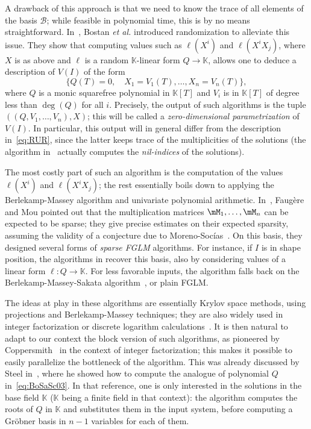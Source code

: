 \documentclass[12pt]{article}
\newcommand{\basis}{\mathscr{B}}
\newcommand{\lf}{X}
\def\K{\mathbb{K}}
\def\K {\ensuremath{\mathbb{K}}}
\begin{document}
A drawback of this approach is that we need to know the trace of all
elements of the basis $\basis$; while feasible in polynomial time,
this is by no means straightforward. In~\cite{BoSaSc03}, Bostan {\it
  et al.} introduced randomization to alleviate this issue. They show
that computing values such as $\ell(\lf^i)$ and $\ell(\lf^i X_j)$, where
$\lf$ is as above and 
$\ell$ is a random $\K$-linear form $Q \to \K$, allows one to deduce
a description of $V(I)$ of the form
\begin{equation}\label{eq:BoSaSc03}
 \{  Q(T)=0, \quad X_1 = V_1(T), \dots,X_n = V_n(T) \},
\end{equation}
where $Q$ is a monic squarefree polynomial in $\K[T]$ and $V_i$ is in
$\K[T]$ of degree less than $\deg(Q)$ for all $i$. Precisely, the
output of such algorithms is the tuple $((Q,V_1,\dots,V_n),\lf)$; this
will be called a {\em zero-dimensional parametrization} of $V(I)$. In
particular, this output will in general differ from the description
in~\eqref{eq:RUR}, since the latter keeps trace of the multiplicities
of the solutions (the algorithm in~\cite{BoSaSc03} actually computes
the {\em nil-indices} of the solutions).

The most costly part of such an algorithm is the computation of the
values $\ell(\lf^i)$ and $\ell(\lf^i X_j)$; the rest essentially boils
down to applying the Berlekamp-Massey algorithm and univariate
polynomial arithmetic. In~\cite{FaMo17}, Faug{\`e}re and Mou pointed
out that the multiplication matrices $\mM_1,\dots,\mM_n$ can be
expected to be sparse; they give precise estimates on their expected
sparsity, assuming the validity of a conjecture due to
Moreno-Soc\'ias~\cite{MorenoSocias91}. 
On this basis, they designed several forms of {\em sparse FGLM}
algorithms. For instance, if $I$ is in shape position, the algorithms
in \cite{FaMo17} recover this basis, also by considering values of
a linear form $\ell:Q \to \K$. For less favorable inputs, the algorithm
falls back on the Berlekamp-Massey-Sakata algorithm~\cite{Sakata90},
or plain FGLM.

The ideas at play in these algorithms are essentially Krylov space
methods, using projections and Berlekamp-Massey techniques; they are
also widely used in integer factorization or discrete logarithm
calculations~\cite{xxx,yyy}. It is then natural to adapt to our
context the block version of such algorithms, as pioneered by
Coppersmith~\cite{Coppersmith94} in the context of integer
factorization; this makes it possible to easily parallelize the
bottleneck of the algorithm. This was already discussed by Steel
in~\cite{Steel15}, where he showed how to compute the analogue of
polynomial $Q$ in~\eqref{eq:BoSaSc03}. In that reference, one is
only interested in the solutions in the base field $\K$ ($\K$ being a
finite field in that context): the algorithm computes the roots of $Q$
in $\K$ and substitutes them in the input system, before computing a
Gr\"obner basis in $n-1$ variables for each of them.
\end{document}
